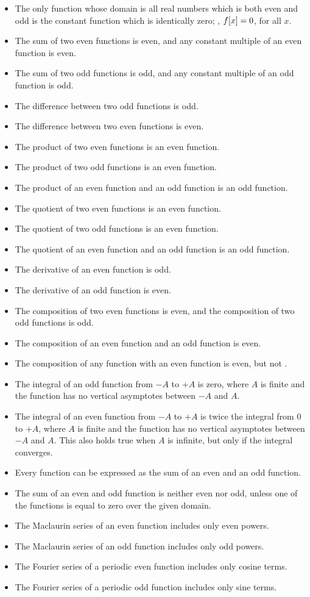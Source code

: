\begin{multicols}{2}
\begin{itemize}
\item The only function whose domain is all real numbers which is both even and odd is the constant function which is identically zero; \ie, $f\!\left[{x}\right] = 0$, for all $x$.
\item The sum of two even functions is even, and any constant multiple of an even function is even.
\item The sum of two odd functions is odd, and any constant multiple of an odd function is odd.
\item The difference between two odd functions is odd.
\item The difference between two even functions is even.
\item The product of two even functions is an even function.
\item The product of two odd functions is an even function.
\item The product of an even function and an odd function is an odd function.
\item The quotient of two even functions is an even function.
\item The quotient of two odd functions is an even function.
\item The quotient of an even function and an odd function is an odd function.
\item The derivative of an even function is odd.
\item The derivative of an odd function is even.
\item The composition of two even functions is even, and the composition of two odd functions is odd.
\item The composition of an even function and an odd function is even.
\item The composition of any function with an even function is even, but not \vis.
\item The integral of an odd function from $-A$ to $+A$ is zero, where $A$ is finite and the function has no vertical asymptotes between $-A$ and $A$.
\item The integral of an even function from $-A$ to $+A$ is twice the integral from 0 to $+A$, where $A$ is finite and the function has no vertical asymptotes between $-A$ and $A$. This also holds true when $A$ is infinite, but only if the integral converges.
\item Every function can be expressed as the sum of an even and an odd function.
\item The sum of an even and odd function is neither even nor odd, unless one of the functions is equal to zero over the given domain.
\item The Maclaurin series of an even function includes only even powers.
\item The Maclaurin series of an odd function includes only odd powers.
\item The Fourier series of a periodic even function includes only cosine terms.
\item The Fourier series of a periodic odd function includes only sine terms.
\end{itemize}
\end{multicols}


